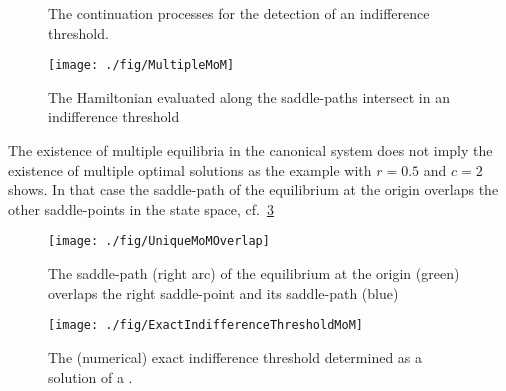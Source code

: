 \begin{figure}
\centering
{}
\caption{The continuation processes for the detection of an indifference threshold.}
\label{fig:multiplemomcont}
\end{figure}
\begin{figure}
\centering
\texttt{[image: ./fig/MultipleMoM]}
\label{fig:multiplemom}
\caption{The Hamiltonian evaluated along the saddle-paths intersect in an indifference threshold}
\end{figure}
\begin{remark}
The existence of multiple equilibria in the canonical system does not imply the existence of multiple optimal solutions as the example with $r=0.5$ and $c=2$ shows. In that case the saddle-path of the equilibrium at the origin overlaps the other saddle-points in the state space, cf.~\cref{fig:uniquemomov}
\end{remark}
\begin{figure}
\centering
\texttt{[image: ./fig/UniqueMoMOverlap]}
\caption{The saddle-path (right arc) of the equilibrium at the origin (green) overlaps the right saddle-point and its saddle-path (blue)}
\label{fig:uniquemomov}
\end{figure}
\begin{figure}
\centering
\texttt{[image: ./fig/ExactIndifferenceThresholdMoM]}
\caption{The (numerical) exact indifference threshold determined as a solution of a \BVP.}
\label{fig:exactindifferencethresholdmom}
\end{figure}
%

